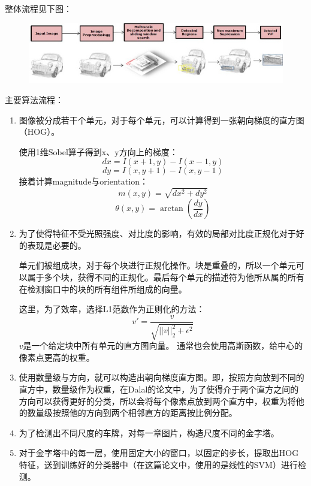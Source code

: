 整体流程见下图：
\begin{figure}[H]
    \centering 
    \includegraphics[width=1\textwidth]{image/2_2_1.jpg}    
    \label{logic}
\end{figure}
主要算法流程：
\begin{enumerate}
\item 
图像被分成若干个单元，对于每个单元，可以计算得到一张朝向梯度的直方图（HOG）。

使用1维Sobel算子得到x、y方向上的梯度：
$$dx=I(x+1,y)-I(x-1,y)$$
$$dy=I(x,y+1)-I(x,y-1)$$
接着计算magnitude与orientation：
$$m(x,y)=\sqrt{dx^2+dy^2}$$
$$\theta(x,y)=\arctan(\frac{dy}{dx})$$
\item
为了使得特征不受光照强度、对比度的影响，有效的局部对比度正规化对于好的表现是必要的。

单元们被组成块，对于每个块进行正规化操作。块是重叠的，所以一个单元可以属于多个块，获得不同的正规化。最后每个单元的描述符为他所从属的所有在检测窗口中的块的所有组件所组成的向量。

这里，为了效率，选择L1范数作为正则化的方法：
$$v'=\frac{v}{\sqrt{||v||^2_2+\epsilon^2}}$$
$v$是一个给定块中所有单元的直方图向量。
通常也会使用高斯函数，给中心的像素点更高的权重。
\item
使用数量级与方向，就可以构造出朝向梯度直方图。即，按照方向放到不同的直方中，数量级作为权重，在Dalal的论文中，为了使得介于两个直方之间的方向可以获得更好的分类，所以会将每个像素点放到两个直方中，权重为将他的数量级按照他的方向到两个相邻直方的距离按比例分配。
\item
为了检测出不同尺度的车牌，对每一章图片，构造尺度不同的金字塔。
\item
对于金字塔中的每一层，使用固定大小的窗口，以固定的步长，提取出HOG特征，送到训练好的分类器中（在这篇论文中，使用的是线性的SVM）进行检测。
\end{enumerate}

